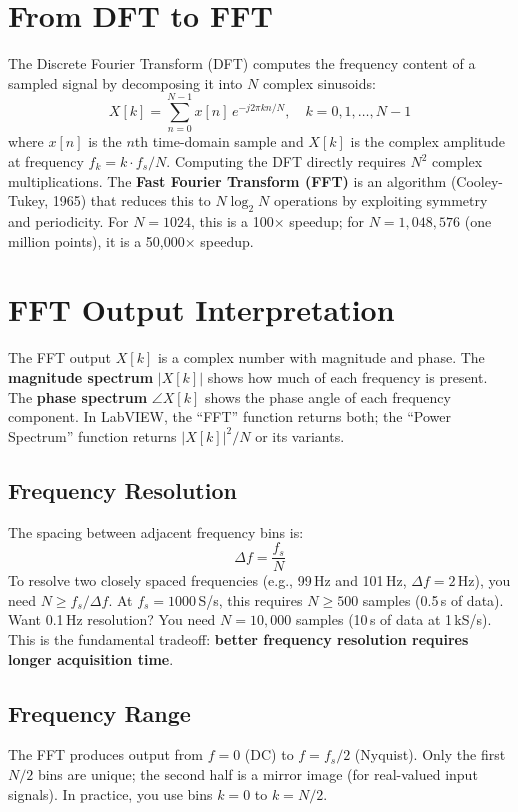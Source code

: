\documentclass[11pt,letterpaper,twoside,openany]{book}
\begin{document}
\section{From DFT to FFT}
The Discrete Fourier Transform (DFT) computes the frequency content of a sampled signal by decomposing it into $N$ complex sinusoids:
\begin{equation}
X[k] = \sum_{n=0}^{N-1} x[n] \, e^{-j2\pi kn/N}, \quad k = 0, 1, \ldots, N-1
\end{equation}
where $x[n]$ is the $n$th time-domain sample and $X[k]$ is the complex amplitude at frequency $f_k = k \cdot f_s / N$. Computing the DFT directly requires $N^2$ complex multiplications. The \textbf{Fast Fourier Transform (FFT)} is an algorithm (Cooley-Tukey, 1965) that reduces this to $N \log_2 N$ operations by exploiting symmetry and periodicity. For $N = 1024$, this is a 100$\times$ speedup; for $N = 1{,}048{,}576$ (one million points), it is a 50{,}000$\times$ speedup.

\section{FFT Output Interpretation}
The FFT output $X[k]$ is a complex number with magnitude and phase. The \textbf{magnitude spectrum} $|X[k]|$ shows how much of each frequency is present. The \textbf{phase spectrum} $\angle X[k]$ shows the phase angle of each frequency component. In LabVIEW, the ``FFT'' function returns both; the ``Power Spectrum'' function returns $|X[k]|^2/N$ or its variants.

\subsection{Frequency Resolution}
The spacing between adjacent frequency bins is:
\begin{equation}
\Delta f = \frac{f_s}{N}
\end{equation}
To resolve two closely spaced frequencies (e.g., 99\,Hz and 101\,Hz, $\Delta f = 2$\,Hz), you need $N \geq f_s / \Delta f$. At $f_s = 1000$\,S/s, this requires $N \geq 500$ samples (0.5\,s of data). Want 0.1\,Hz resolution? You need $N = 10{,}000$ samples (10\,s of data at 1\,kS/s). This is the fundamental tradeoff: \textbf{better frequency resolution requires longer acquisition time}.

\subsection{Frequency Range}
The FFT produces output from $f = 0$ (DC) to $f = f_s/2$ (Nyquist). Only the first $N/2$ bins are unique; the second half is a mirror image (for real-valued input signals). In practice, you use bins $k = 0$ to $k = N/2$.
\end{document}
